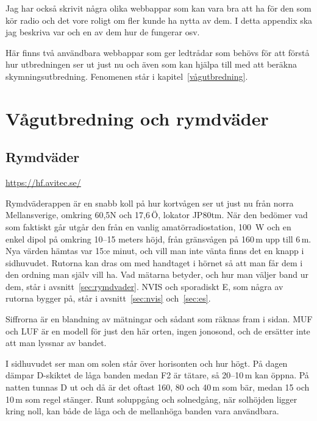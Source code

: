 Jag har också skrivit några olika webbappar som kan vara bra att ha
för den som kör radio och det vore roligt om fler kunde ha nytta av
dem. I detta appendix ska jag beskriva var och en av dem hur de
fungerar osv.

Här finns två användbara webbappar som ger ledtrådar som behövs för
att förstå hur utbredningen ser ut just nu och även som kan hjälpa
till med att beräkna skymningsutbredning. Fenomenen står i
kapitel~\ref{vågutbredning}.

\section{Vågutbredning och rymdväder}

\subsection{Rymdväder}
\label{rymdväderapp}

\url{https://hf.avitec.se/}

Rymdväderappen är en snabb koll på hur kortvågen ser ut just nu från
norra Mellansverige, omkring 60,5\textdegree N och 17,6\textdegree\,Ö,
lokator JP80tm. När den bedömer vad som faktiskt går utgår den från en
vanlig amatörradiostation, 100~W och en enkel dipol på omkring 10--15
meters höjd, från gränsvågen på 160\,m upp till 6\,m. Nya värden hämtas
var 15:e minut, och vill man inte vänta finns det en knapp i sidhuvudet.
Rutorna kan dras om med handtaget i hörnet så att man får dem i den
ordning man själv vill ha. Vad mätarna betyder, och hur man väljer
band ur dem, står i avsnitt~\ref{sec:rymdvader}. NVIS och sporadiskt
E, som några av rutorna bygger på, står i avsnitt~\ref{sec:nvis}
och~\ref{sec:es}.

Siffrorna är en blandning av mätningar och sådant som räknas fram i
sidan. MUF och LUF är en modell för just den här orten, ingen jonosond,
och de ersätter inte att man lyssnar av bandet.

I sidhuvudet ser man om solen står över horisonten och hur högt. På dagen
dämpar D-skiktet de låga banden medan F2 är tätare, så 20--10\,m kan
öppna. På natten tunnas D ut och då är det oftast 160, 80 och 40\,m som
bär, medan 15 och 10\,m som regel stänger. Runt soluppgång och
solnedgång, när solhöjden ligger kring noll, kan både de låga och de
mellanhöga banden vara användbara.

